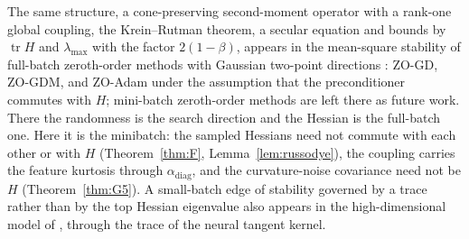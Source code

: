 \documentclass[11pt]{article}
\theoremstyle{remark}
\newcommand{\tr}{\operatorname{tr}}
\begin{document}
The same structure, a cone-preserving second-moment operator with a rank-one global coupling, the Krein--Rutman theorem, a secular equation and bounds by $\tr H$ and $\lambda_{\max}$ with the factor $2(1-\beta)$, appears in the mean-square stability of full-batch zeroth-order methods with Gaussian two-point directions \citep{song2026zeroth}: ZO-GD, ZO-GDM, and ZO-Adam under the assumption that the preconditioner commutes with $H$; mini-batch zeroth-order methods are left there as future work. There the randomness is the search direction and the Hessian is the full-batch one. Here it is the minibatch: the sampled Hessians need not commute with each other or with $H$ (Theorem~\ref{thm:F}, Lemma~\ref{lem:russodye}), the coupling carries the feature kurtosis through $\alpha_{\mathrm{diag}}$, and the curvature-noise covariance need not be $H$ (Theorem~\ref{thm:G5}). A small-batch edge of stability governed by a trace rather than by the top Hessian eigenvalue also appears in the high-dimensional model of \citet{agarwala2024high}, through the trace of the neural tangent kernel.
\end{document}
